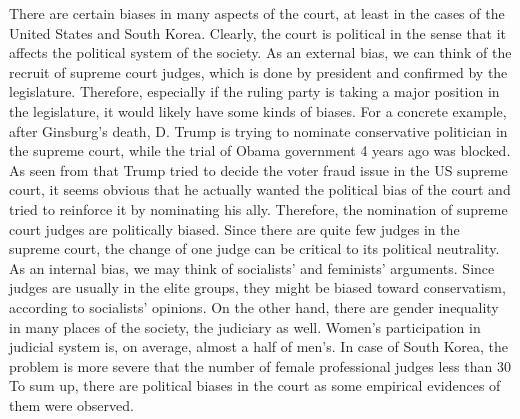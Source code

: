 \documentclass{homework}
\begin{document}
There are certain biases in many aspects of the court, at least in the cases of the United States and South Korea. Clearly, the court is political in the sense that it affects the political system of the society.
As an external bias, we can think of the recruit of supreme court judges, which is done by president and confirmed by the legislature. Therefore, especially if the ruling party is taking a major position in the legislature, it would likely have some kinds of biases. For a concrete example, after Ginsburg's death, D. Trump is trying to nominate conservative politician in the supreme court, while the trial of Obama government 4 years ago was blocked. As seen from that Trump tried to decide the voter fraud issue in the US supreme court, it seems obvious that he actually wanted the political bias of the court and tried to reinforce it by nominating his ally. Therefore, the nomination of supreme court judges are politically biased. Since there are quite few judges in the supreme court, the change of one judge can be critical to its political neutrality.
As an internal bias, we may think of socialists' and feminists' arguments. Since judges are usually in the elite groups, they might be biased toward conservatism, according to socialists' opinions. On the other hand, there are gender inequality in many places of the society, the judiciary as well. Women's participation in judicial system is, on average, almost a half of men's. In case of South Korea, the problem is more severe that the number of female professional judges less than 30%
To sum up, there are political biases in the court as some empirical evidences of them were observed.
\end{document}
